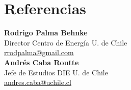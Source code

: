 \section{Referencias \faUsers}
\textbf{Rodrigo Palma Behnke}\\
Director Centro de Energía U. de Chile\\
\faEnvelopeO\hspace{.1cm}\href{mailto:rrodpalma@gmail.com}{rrodpalma@gmail.com}\\
\sectionsep
\textbf{Andrés Caba Routte}\\
Jefe de Estudios DIE U. de Chile\\
\faEnvelopeO\hspace{.1cm}\href{mailto:andres.caba@uchile.cl}{andres.caba@uchile.cl}
